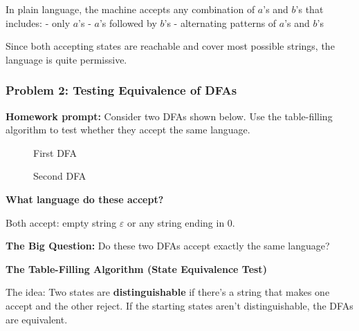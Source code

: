 \documentclass{article}
\theoremstyle{theorem}
\theoremstyle{definition}
\theoremstyle{remark}
\begin{document}
In plain language, the machine accepts any combination of $a$'s and $b$'s that includes:
- only $a$'s
- $a$'s followed by $b$'s
- alternating patterns of $a$'s and $b$'s

Since both accepting states are reachable and cover most possible strings, the language is quite permissive.

\subsubsection{Problem 2: Testing Equivalence of DFAs}

\textbf{Homework prompt:} Consider two DFAs shown below. Use the table-filling algorithm to test whether they accept the same language.

\begin{figure}[H]
  \centering
  \caption{First DFA}
\end{figure}

\begin{figure}[H]
  \centering
  \caption{Second DFA}
\end{figure}

\textbf{What language do these accept?}

Both accept: empty string $\varepsilon$ or any string ending in $0$.

\textbf{The Big Question:} Do these two DFAs accept exactly the same language?

\textbf{The Table-Filling Algorithm (State Equivalence Test)}

The idea: Two states are \textbf{distinguishable} if there's a string that makes one accept and the other reject. If the starting states aren't distinguishable, the DFAs are equivalent.
\end{document}
